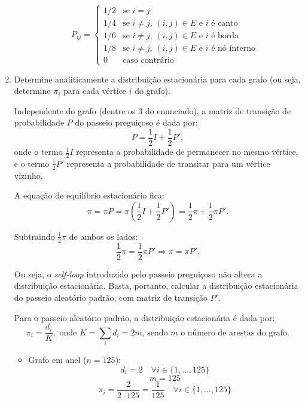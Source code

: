\begin{enumerate}
\begin{resposta}
\begin{itemize}
            $$
            P_{ij} = \begin{cases}
                1/2 & \text{se } i = j \\
                1/4 & \text{se } i \neq j \text{, } (i,j) \in E \text{ e }i \text{ é canto} \\
                1/6 & \text{se } i \neq j \text{, } (i,j) \in E \text{ e }i \text{ é borda} \\
                1/8 & \text{se } i \neq j \text{, } (i,j) \in E \text{ e }i \text{ é nó interno} \\
                0 & \text{caso contrário}
            \end{cases}
            $$
        \end{itemize}
    \end{resposta}

    \item Determine analiticamente a distribuição estacionária para cada grafo (ou seja, determine $\pi_i$ para cada vértice $i$ do grafo).
    \begin{resposta}
        Independente do grafo (dentre os 3 do enunciado), a matriz de transição de probabilidade $P$ do passeio preguiçoso é dada por:
        $$
        P = \frac{1}{2}I + \frac{1}{2}P',
        $$
        onde o termo $\frac{1}{2}I$ representa a probabilidade de permanecer no mesmo vértice, e o termo $\frac{1}{2}P'$ representa a probabilidade de transitar para um vértice vizinho.
        
        A equação de equilíbrio estacionário fica:
        $$
        \pi = \pi P = \pi \left( \frac{1}{2}I + \frac{1}{2}P' \right) = \frac{1}{2}\pi + \frac{1}{2}\pi P'.
        $$
        
        Subtraindo $\frac{1}{2}\pi$ de ambos os lados:
        $$
        \frac{1}{2}\pi = \frac{1}{2}\pi P' \Rightarrow \pi = \pi P'.
        $$
        
        Ou seja, o \textit{self-loop} introduzido pelo passeio preguiçoso não altera a distribuição estacionária. Basta, portanto, calcular a distribuição estacionária do passeio aleatório padrão, com matriz de transição $P'$.
        
        Para o passeio aleatório padrão, a distribuição estacionária é dada por:
        $$\pi_i = \frac{d_i}{K}, \text{ onde } K=\sum_i d_i=2m \text{, sendo } m \text{ o número de arestas do grafo.} $$

        \begin{itemize}
            \item Grafo em anel ($n = 125$):
            $$d_i = 2 \quad \forall i \in \{1, \dots, 125\}$$
            $$ m = 125 $$
            $$ \pi_i = \frac{2}{2 \cdot 125} = \frac{1}{125} \quad \forall i \in \{1, \dots, 125\} $$


\end{itemize}
\end{resposta}
\end{enumerate}
